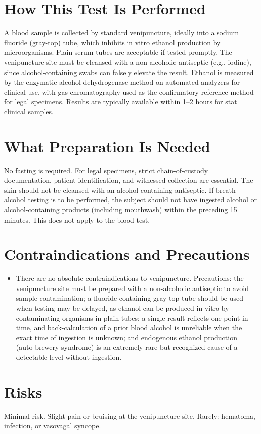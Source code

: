 \section*{How This Test Is Performed}
A blood sample is collected by standard venipuncture, ideally into a sodium fluoride (gray-top) tube, which inhibits in vitro ethanol production by microorganisms. Plain serum tubes are acceptable if tested promptly. The venipuncture site must be cleansed with a non-alcoholic antiseptic (e.g., iodine), since alcohol-containing swabs can falsely elevate the result. Ethanol is measured by the enzymatic alcohol dehydrogenase method on automated analyzers for clinical use, with gas chromatography used as the confirmatory reference method for legal specimens. Results are typically available within 1--2 hours for stat clinical samples.
\section*{What Preparation Is Needed}
No fasting is required. For legal specimens, strict chain-of-custody documentation, patient identification, and witnessed collection are essential. The skin should not be cleansed with an alcohol-containing antiseptic. If breath alcohol testing is to be performed, the subject should not have ingested alcohol or alcohol-containing products (including mouthwash) within the preceding 15 minutes. This does not apply to the blood test.
\section*{Contraindications and Precautions}
\begin{itemize}
  \item There are no absolute contraindications to venipuncture. Precautions: the venipuncture site must be prepared with a non-alcoholic antiseptic to avoid sample contamination; a fluoride-containing gray-top tube should be used when testing may be delayed, as ethanol can be produced in vitro by contaminating organisms in plain tubes; a single result reflects one point in time, and back-calculation of a prior blood alcohol is unreliable when the exact time of ingestion is unknown; and endogenous ethanol production (auto-brewery syndrome) is an extremely rare but recognized cause of a detectable level without ingestion.
\end{itemize}
\section*{Risks}
Minimal risk. Slight pain or bruising at the venipuncture site. Rarely: hematoma, infection, or vasovagal syncope.
